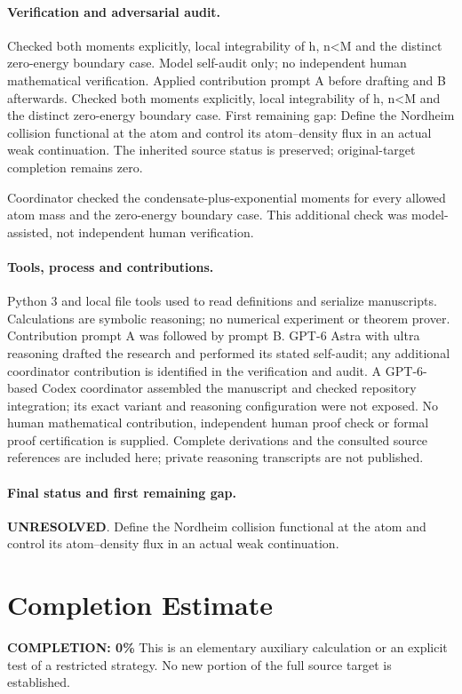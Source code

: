 \documentclass[11pt]{article}
\begin{document}
\paragraph{Verification and adversarial audit.}
Checked both moments explicitly, local integrability of h, n<M and the distinct zero-energy boundary case. Model self-audit only; no independent human mathematical verification. Applied contribution prompt A before drafting and B afterwards. Checked both moments explicitly, local integrability of h, n<M and the distinct zero-energy boundary case. First remaining gap: Define the Nordheim collision functional at the atom and control its atom--density flux in an actual weak continuation. The inherited source status is preserved; original-target completion remains zero.

Coordinator checked the condensate-plus-exponential moments for every allowed atom mass and the zero-energy boundary case. This additional check was model-assisted, not independent human verification.

\paragraph{Tools, process and contributions.}
Python 3 and local file tools used to read definitions and serialize manuscripts. Calculations are symbolic reasoning; no numerical experiment or theorem prover. Contribution prompt A was followed by prompt B. GPT-6 Astra with ultra reasoning drafted the research and performed its stated self-audit; any additional coordinator contribution is identified in the verification and audit. A GPT-6-based Codex coordinator assembled the manuscript and checked repository integration; its exact variant and reasoning configuration were not exposed. No human mathematical contribution, independent human proof check or formal proof certification is supplied. Complete derivations and the consulted source references are included here; private reasoning transcripts are not published.

\paragraph{Final status and first remaining gap.}
\textbf{UNRESOLVED}. Define the Nordheim collision functional at the atom and control its atom--density flux in an actual weak continuation.

\section{Completion Estimate}
\noindent\textbf{COMPLETION: 0\%}
This is an elementary auxiliary calculation or an explicit test of a restricted strategy. No new portion of the full source target is established.
\end{document}
